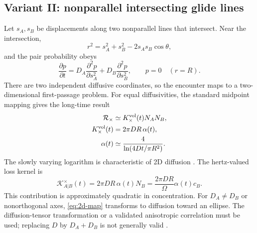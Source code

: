 \documentclass[11pt]{article}
\newcommand{\KK}{\mathcal{K}}
\newcommand{\Rcal}{\mathcal{R}}
\begin{document}
\subsection{Variant II: nonparallel intersecting glide lines}
Let \(s_A,s_B\) be displacements along two nonparallel lines that intersect.
Near the intersection,
\begin{equation}
 r^2=s_A^2+s_B^2-2s_As_B\cos\theta,
\end{equation}
and the pair probability obeys
\begin{equation}
 \frac{\partial p}{\partial t}
 =D_A\frac{\partial^2p}{\partial s_A^2}
 +D_B\frac{\partial^2p}{\partial s_B^2},
 \qquad p=0\quad(r=R).                             \label{eq:2d-map}
\end{equation}
There are two independent diffusive coordinates, so the encounter maps to a
two-dimensional first-passage problem. For equal diffusivities, the standard
midpoint mapping gives the long-time result
\begin{align}
 \Rcal_{\times}&\simeq K^{\rm vol}_{\times}(t)N_AN_B,\\
 K^{\rm vol}_{\times}(t)&=2\pi DR\,\alpha(t),       \label{eq:Kcross-vol}\\
 \alpha(t)&\simeq\frac{4}{\ln\!\left(4Dt/\pi R^2\right)}.
 \label{eq:alpha}
\end{align}
The slowly varying logarithm is characteristic of 2D diffusion
\cite{GoseleHuntley1975,Adjanor2022}. The hertz-valued loss kernel is
\begin{equation}
 \boxed{\KK_{A|B}^{\times}(t)
 =2\pi DR\,\alpha(t)N_B
 =\frac{2\pi DR}{\Omega}\alpha(t)c_B.}             \label{eq:Kcross-Hz}
\end{equation}
This contribution is approximately quadratic in concentration. For
\(D_A\ne D_B\) or nonorthogonal axes, \cref{eq:2d-map} transforms to diffusion
toward an ellipse. The diffusion-tensor transformation or a validated
anisotropic correlation must be used; replacing \(D\) by \(D_A+D_B\) is not
generally valid \cite{GoseleSeeger1976,Adjanor2022,HuangMarian2019}.
\end{document}
